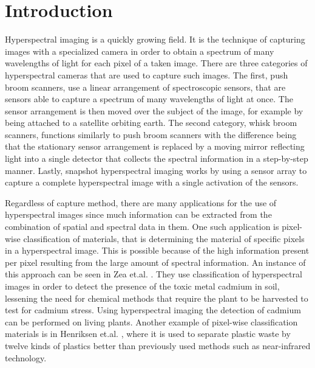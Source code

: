 \chapter{Introduction\label{cha:chapter1}}
Hyperspectral imaging is a quickly growing field. It is the technique of capturing images with a specialized camera in order to obtain a spectrum of many wavelengths of light for each pixel of a taken image. There are three categories of hyperspectral cameras that are used to capture such images. The first, push broom scanners, use a linear arrangement of spectroscopic sensors, that are sensors able to capture a spectrum of many wavelengths of light at once. The sensor arrangement is then moved over the subject of the image, for example by being attached to a satellite orbiting earth. The second category, whisk broom scanners, functions similarly to push broom scanners with the difference being that the stationary sensor arrangement is replaced by a moving mirror reflecting light into a single detector that collects the spectral information in a step-by-step manner. Lastly, snapshot hyperspectral imaging works by using a sensor array to capture a complete hyperspectral image with a single activation of the sensors. 

Regardless of capture method, there are many applications for the use of hyperspectral images since much information can be extracted from the combination of spatial and spectral data in them. One such application is pixel-wise classification of materials, that is determining the material of specific pixels in a hyperspectral image. This is possible because of the high information present per pixel resulting from the large amount of spectral information. An instance of this approach can be seen in Zea et.al. \citep{zea_leveraging_2022}. They use classification of hyperspectral images in order to detect the presence of the toxic metal cadmium in soil, lessening the need for chemical methods that require the plant to be harvested to test for cadmium stress. Using hyperspectral imaging the detection of cadmium can be performed on living plants. Another example of pixel-wise classification materials is in Henriksen et.al. \citep{henriksen_plastic_2022}, where it is used to separate plastic waste by twelve kinds of plastics better than previously used methods such as near-infrared technology.

